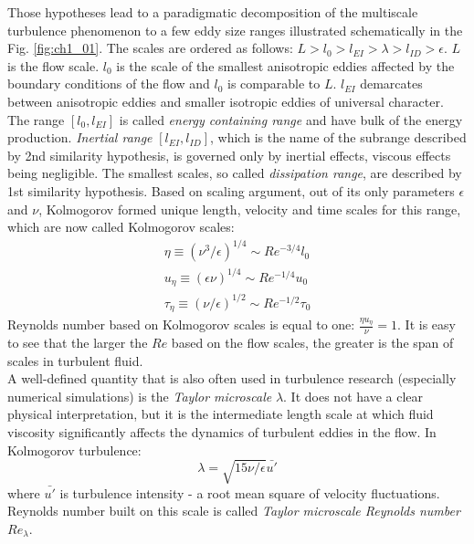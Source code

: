 \documentclass[../main.tex]{subfiles}
\begin{document}
Those hypotheses lead to a paradigmatic decomposition of the multiscale turbulence phenomenon to a few eddy size ranges illustrated schematically in the Fig. \ref{fig:ch1_01}. The scales are ordered as follows: $L>l_0>l_{EI}>\lambda>l_{ID}>\epsilon$. $L$ is the flow scale. $l_0$ is the scale of the smallest anisotropic eddies affected by the boundary conditions of the flow and $l_0$ is comparable to $L$. $l_{EI} $ demarcates between anisotropic eddies and smaller isotropic eddies of universal character. The range $[l_0, l_{EI}]$ is called \emph{energy containing range} and have bulk of the energy production.  \emph{Inertial range} $[l_{EI},l_{ID}]$, which is the name of the subrange described by 2nd similarity hypothesis, is governed only by inertial effects, viscous effects being negligible.  The smallest scales, so called \emph{dissipation range}, are described by 1st similarity hypothesis. Based on scaling argument, out of its only parameters $\epsilon$ and $\nu$, Kolmogorov formed unique length, velocity and time scales for this range, which are now called Kolmogorov scales:
\begin{align}
\eta \equiv (\nu^3/\epsilon)^{1/4} \sim Re^{-3/4} l_0\\
u_{\eta} \equiv (\epsilon \nu)^{1/4}\sim Re^{-1/4} u_0\\
\tau_{\eta} \equiv (\nu/\epsilon)^{1/2}\sim Re^{-1/2} \tau_0
\label{def:Kol_scales}
\end{align}
Reynolds number based on Kolmogorov scales is equal to one: $\frac{\eta u_{\eta}}{\nu}=1$. It is easy to see that the larger the $Re$ based on the flow scales, the greater is the span of scales in turbulent fluid.\\
A well-defined quantity that is also often used in turbulence research (especially numerical simulations)  is the \emph{Taylor microscale} $\lambda$. It does not have a clear physical interpretation, but it is the intermediate length scale at which fluid viscosity significantly affects the dynamics of turbulent eddies in the flow. In Kolmogorov turbulence:
\begin{equation}
\lambda=\sqrt{15 \nu/\epsilon} \bar{u'}
\label{def:Tylor_scale}
\end{equation}
where $\bar{u'}$ is turbulence intensity - a root mean square of velocity fluctuations. Reynolds number built on this scale is called \emph{Taylor microscale Reynolds number} $Re_{\lambda}$.\\
\end{document}
